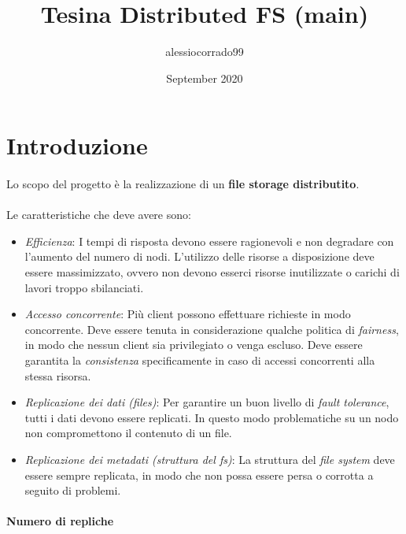 \documentclass{article}
\title{Tesina Distributed FS (main)}
\author{alessiocorrado99 }
\date{September 2020}
\begin{document}
\maketitle

\section{Introduzione} 

\paragraph{} Lo scopo del progetto è la realizzazione di un \textbf{file storage distributito}. 

\paragraph{} Le caratteristiche che deve avere sono:

\begin{itemize}
	\item \emph{Efficienza}: I tempi di risposta devono essere ragionevoli e non degradare con l'aumento del numero di nodi. L'utilizzo delle risorse a disposizione deve essere massimizzato, ovvero non devono esserci risorse inutilizzate o carichi di lavori troppo sbilanciati.  
	
	\item \emph{Accesso concorrente}: Più client possono effettuare richieste in modo concorrente. Deve essere tenuta in considerazione qualche politica di \emph{fairness}, 
	in modo che nessun client sia privilegiato o venga escluso. Deve essere garantita la 
	\emph{consistenza} specificamente in caso di accessi concorrenti alla stessa risorsa. 
	 
	\item \emph{Replicazione dei dati (files)}: Per garantire un buon livello di \emph{fault tolerance}, tutti i dati devono essere replicati. In questo modo problematiche su un nodo non compromettono il contenuto di un file. 
	
	\item \emph{Replicazione dei metadati (struttura del fs)}: La struttura del \emph{file system} deve essere sempre replicata, in modo che non possa essere persa o corrotta a seguito di problemi. 
\end{itemize} 



\paragraph{Numero di repliche}
\end{document}
